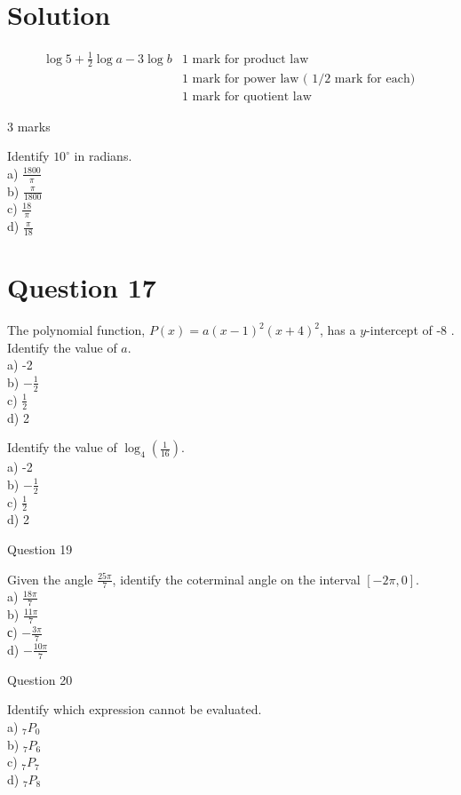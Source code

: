 \documentclass[10pt]{article}
\begin{document}
\section*{Solution}
$$
\begin{array}{ll}
\log 5+\frac{1}{2} \log a-3 \log b & 1 \text { mark for product law } \\
& 1 \text { mark for power law ( } 1 / 2 \text { mark for each) } \\
& 1 \text { mark for quotient law }
\end{array}
$$

3 marks

Identify $10^{\circ}$ in radians.\\
a) $\frac{1800}{\pi}$\\
b) $\frac{\pi}{1800}$\\
c) $\frac{18}{\pi}$\\
d) $\frac{\pi}{18}$

\section*{Question 17}
The polynomial function, $P(x)=a(x-1)^{2}(x+4)^{2}$, has a $y$-intercept of -8 .\\
Identify the value of $a$.\\
a) -2\\
b) $-\frac{1}{2}$\\
c) $\frac{1}{2}$\\
d) 2

Identify the value of $\log _{4}\left(\frac{1}{16}\right)$.\\
a) -2\\
b) $-\frac{1}{2}$\\
c) $\frac{1}{2}$\\
d) 2

Question 19

Given the angle $\frac{25 \pi}{7}$, identify the coterminal angle on the interval $[-2 \pi, 0]$.\\
a) $\frac{18 \pi}{7}$\\
b) $\frac{11 \pi}{7}$\\
с) $-\frac{3 \pi}{7}$\\
d) $-\frac{10 \pi}{7}$

Question 20

Identify which expression cannot be evaluated.\\
a) ${ }_{7} P_{0}$\\
b) ${ }_{7} P_{6}$\\
c) ${ }_{7} P_{7}$\\
d) ${ }_{7} P_{8}$
\end{document}
